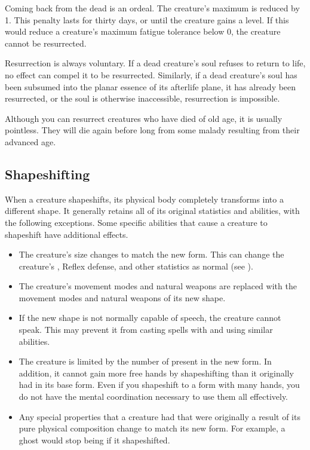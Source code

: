     Coming back from the dead is an ordeal.
    The creature's maximum  is reduced by 1.
    This penalty lasts for thirty days, or until the creature gains a level.
    If this would reduce a creature's maximum fatigue tolerance below 0, the creature cannot be resurrected.

    Resurrection is always voluntary.
    If a dead creature's soul refuses to return to life, no effect can compel it to be resurrected.
    Similarly, if a dead creature's soul has been subsumed into the planar essence of its afterlife plane, it has already been resurrected, or the soul is otherwise inaccessible, resurrection is impossible.

    Although you can resurrect creatures who have died of old age, it is usually pointless.
    They will die again before long from some malady resulting from their advanced age.

  \subsection{Shapeshifting}\label{Shapeshifting}
    When a creature shapeshifts, its physical body completely transforms into a different shape.
    It generally retains all of its original statistics and abilities, with the following exceptions.
    Some specific abilities that cause a creature to shapeshift have additional effects.
    \begin{itemize}
      \item The creature's size changes to match the new form.
        This can change the creature's , Reflex defense, and other statistics as normal (see ).
      \item The creature's  movement modes and natural weapons are replaced with the movement modes and natural weapons of its new shape.
      \item If the new shape is not normally capable of speech, the creature cannot speak.
        This may prevent it from casting spells with  and using similar abilities.
      \item The creature is limited by the number of  present in the new form.
        In addition, it cannot gain more free hands by shapeshifting than it originally had in its base form.
        Even if you shapeshift to a form with many hands, you do not have the mental coordination necessary to use them all effectively.
      \item Any special properties that a creature had that were originally a result of its pure physical composition change to match its new form.
        For example, a ghost would stop being  if it shapeshifted.
    \end{itemize}

